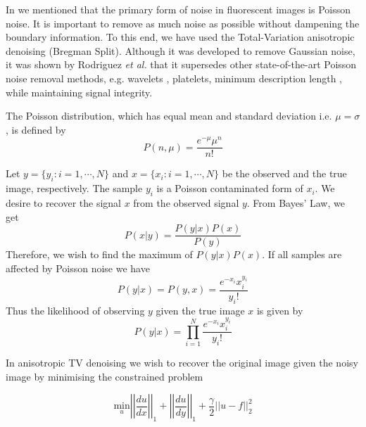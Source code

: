 \begin{definition}
	In  we mentioned that the primary form of noise in fluorescent images is Poisson noise. It is important to remove as much noise as possible without dampening the boundary information. To this end, we have used the Total-Variation anisotropic denoising (Bregman Split). Although it was developed to remove Gaussian noise, it was shown by Rodriguez \textit{et al.}\citep{Rodriguez2008} that it supersedes other state-of-the-art Poisson noise removal methods, e.g.  wavelets \citep{Timmermann1999}, platelets\citep{Willett2004}, minimum description length \citep{Nowak1999}, while maintaining signal integrity. 
	
	The Poisson distribution, which has equal mean and standard deviation i.e. $\mu = \sigma$, is defined by
	\begin{equation}
	P(n,\mu) = \frac{e^{-\mu}\mu^{n}}{n!}
	\label{eq:poissondist}
	\end{equation}
	
	Let $y = \lbrace y_i:i=1, \cdots, N \rbrace$ and $x = \lbrace x_i:i=1, \cdots, N \rbrace$ be the observed and the true image, respectively. The sample $y_i$ is a Poisson contaminated form of $x_i$. We desire to recover the signal $x$ from the observed signal $y$. From Bayes' Law, we get
	\begin{equation}
	P(x \vert y) = \frac{P(y \vert x)P(x)}{P(y)}
	\label{eq:bayeslaw}
	\end{equation}
	Therefore, we wish to find the maximum of $P(y \vert x)P(x)$. If all samples are affected by Poisson noise we have
	\begin{equation}
	P(y \vert x) = P(y,x) = \frac{e^{-x_i}x_i^{y_i}}{y_i!}
	\label{eq:poissonafect}
	\end{equation}
	Thus the likelihood of observing $y$ given the true image $x$ is given by
	\begin{equation}
	P(y \vert x) = \prod_{i=1}^{N} \frac{e^{-x_i}x_i^{y_i}}{y_i!}
	\label{eq:poissonlikelihood}
	\end{equation}
	
	In anisotropic TV denoising we wish to recover the original image given the noisy image by minimising the constrained problem
	
	\begin{equation}
	\underset{u} {\mathrm{min}} \left| \left| \frac{du}{dx} \right| \right|_1 + \left| \left| \frac{du}{dy} \right| \right|_1 + \frac{\gamma}{2} \left| \left| u-f \right| \right|^2_2
	\label{equ:anisotropic_tv_constrained}
	\end{equation}
	

\end{definition}
